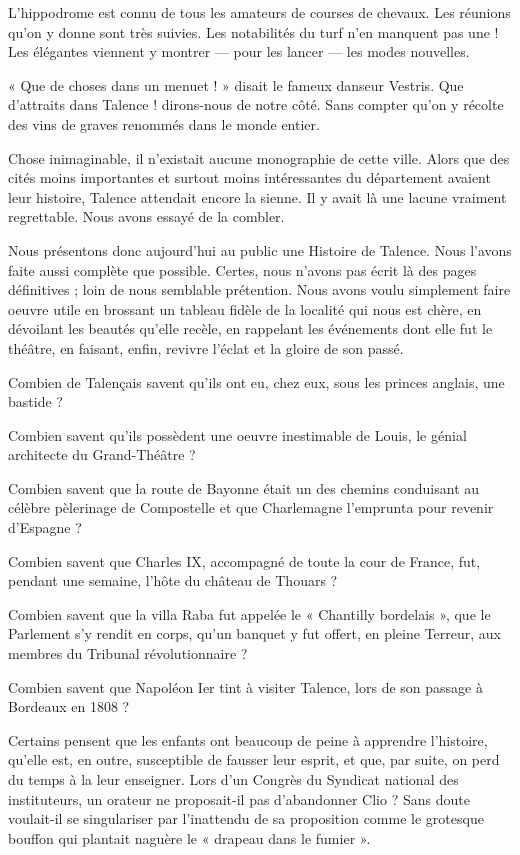 L'hippodrome est connu de tous les amateurs de courses de chevaux. Les réunions qu'on y donne sont très suivies. Les notabilités du turf n'en manquent pas une ! Les élégantes viennent y montrer — pour les lancer — les modes nouvelles.

« Que de choses dans un menuet ! » disait le fameux danseur Vestris. Que d'attraits dans Talence ! dirons-nous de notre côté. Sans compter qu'on y récolte des vins de graves renommés dans le monde entier.

Chose inimaginable, il n'existait aucune monographie de cette ville. Alors que des cités moins importantes et surtout moins intéressantes du département avaient leur histoire, Talence attendait encore la sienne. Il y avait là une lacune vraiment regrettable. Nous avons essayé de la combler.

Nous présentons donc aujourd'hui au public une Histoire de Talence. Nous l'avons faite aussi complète que possible. Certes, nous n'avons pas écrit là des pages définitives ; loin de nous semblable prétention. Nous avons voulu simplement faire oeuvre utile en brossant un tableau fidèle de la localité qui nous est chère, en dévoilant les beautés qu'elle recèle, en rappelant les événements dont elle fut le théâtre, en faisant, enfin, revivre l'éclat et la gloire de son passé.

Combien de Talençais savent qu'ils ont eu, chez eux, sous les princes anglais, une bastide ?

Combien savent qu'ils possèdent une oeuvre inestimable de Louis, le génial architecte du Grand-Théâtre ?

Combien savent que la route de Bayonne était un des chemins conduisant au célèbre pèlerinage de Compostelle et que Charlemagne l'emprunta pour revenir d'Espagne ?

Combien savent que Charles IX, accompagné de toute la cour de France, fut, pendant une semaine, l'hôte du château de Thouars ?

Combien savent que la villa Raba fut appelée le « Chantilly bordelais », que le Parlement s'y rendit en corps, qu'un banquet y fut offert, en pleine Terreur, aux membres du Tribunal révolutionnaire ?

Combien savent que Napoléon Ier tint à visiter Talence, lors de son passage à Bordeaux en 1808 ?

Certains pensent que les enfants ont beaucoup de peine à apprendre l'histoire, qu'elle est, en outre, susceptible de fausser leur esprit, et que, par suite, on perd du temps à la leur enseigner. Lors d'un Congrès du Syndicat national des instituteurs, un orateur ne proposait-il pas d'abandonner Clio ? Sans doute voulait-il se singulariser par l'inattendu de sa proposition comme le grotesque bouffon qui plantait naguère le « drapeau dans le fumier ».


